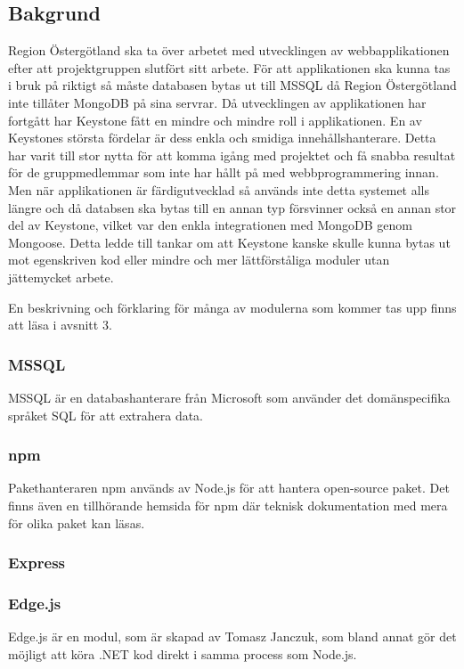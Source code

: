 \subsection{Bakgrund}
Region Östergötland ska ta över arbetet med utvecklingen av webbapplikationen efter att projektgruppen slutfört sitt arbete. För att applikationen ska kunna tas i bruk på riktigt så måste databasen bytas ut till MSSQL då Region Östergötland inte tillåter MongoDB på sina servrar. Då utvecklingen av applikationen har fortgått har Keystone fått en mindre och mindre roll i applikationen. En av Keystones största fördelar är dess enkla och smidiga innehållshanterare. Detta har varit till stor nytta för att komma igång med projektet och få snabba resultat för de gruppmedlemmar som inte har hållt på med webbprogrammering innan. Men när applikationen är färdigutvecklad så används inte detta systemet alls längre och då databsen ska bytas till en annan typ försvinner också en annan stor del av Keystone, vilket var den enkla integrationen med MongoDB genom Mongoose. Detta ledde till tankar om att Keystone kanske skulle kunna bytas ut mot egenskriven kod eller mindre och mer lättförståliga moduler utan jättemycket arbete.

En beskrivning och förklaring för många av modulerna som kommer tas upp finns att läsa i avsnitt 3.
\subsubsection{MSSQL}
MSSQL är en databashanterare från Microsoft som använder det domänspecifika språket SQL för att extrahera data.

\subsubsection{npm}
Pakethanteraren npm används av Node.js för att hantera open-source paket. Det finns även en tillhörande hemsida för npm där teknisk dokumentation med mera för olika paket kan läsas. 

\subsubsection{Express}

\subsubsection{Edge.js}
Edge.js är en modul, som är skapad av Tomasz Janczuk, som bland annat gör det möjligt att köra .NET kod direkt i samma process som Node.js. 

